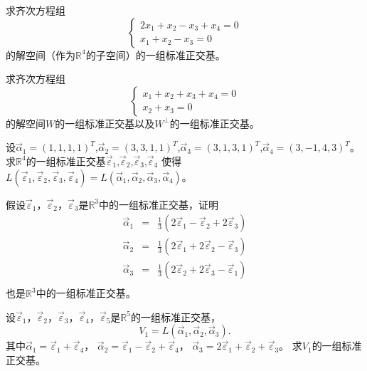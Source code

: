 \begin{ex}\label{6.13}
求齐次方程组
\begin{equation*}
  \begin{cases}
  2x_1+x_2-x_3+x_4=0\\
  x_1+x_2-x_3=0
  \end{cases}
\end{equation*}
的解空间（作为$\mathbb{R}^4$的子空间）的一组标准正交基。
\end{ex}

\begin{ex}\label{6.14}
求齐次方程组
\begin{equation*}
  \begin{cases}
  x_1+x_2+x_3+x_4=0\\
  x_2+x_3=0
  \end{cases}
\end{equation*}
的解空间$W$的一组标准正交基以及$W^{\bot}$的一组标准正交基。
\end{ex}

\begin{ex}\label{6.15}
设$\vec{\alpha}_1=(1,1,1,1)^T$,$\vec{\alpha}_2=(3,3,1,1)^T$,$\vec{\alpha}_3=(3,1,3,1)^T$,$\vec{\alpha}_4=(3,-1,4,3)^T$。
求$\mathbb{R}^4$的一组标准正交基$\vec{\varepsilon}_1$,$\vec{\varepsilon}_2$,$\vec{\varepsilon}_3$,$\vec{\varepsilon}_4$ 使得\\
$L(\vec{\varepsilon}_1,\vec{\varepsilon}_2,\vec{\varepsilon}_3,\vec{\varepsilon}_4)=L(\vec{\alpha}_1,\vec{\alpha}_2,\vec{\alpha}_3,\vec{\alpha}_4)$。
\end{ex}

\begin{ex}\label{6.16}
假设$\vec{\varepsilon}_1$，$\vec{\varepsilon}_2$，$\vec{\varepsilon}_3$是$\mathbb{R}^3$中的一组标准正交基，证明
\begin{eqnarray*}
 \vec{\alpha}_1 &=& \frac{1}{3}(2\vec{\varepsilon}_1-\vec{\varepsilon}_2+2\vec{\varepsilon}_3) \\
 \vec{\alpha}_2 &=& \frac{1}{3}(2\vec{\varepsilon}_1+2\vec{\varepsilon}_2-\vec{\varepsilon}_3) \\
 \vec{\alpha}_3 &=& \frac{1}{3}(2\vec{\varepsilon}_2+2\vec{\varepsilon}_3-\vec{\varepsilon}_1) \\
\end{eqnarray*}
也是$\mathbb{R}^3$中的一组标准正交基。
\end{ex}

\begin{ex}\label{6.17}
设$\vec{\varepsilon}_1$，$\vec{\varepsilon}_2$，$\vec{\varepsilon}_3$，$\vec{\varepsilon}_4$，$\vec{\varepsilon}_5$是$\mathbb{R}^5$的一组标准正交基，
\begin{equation*}
  V_1=L(\vec{\alpha}_1,\vec{\alpha}_2,\vec{\alpha}_3).
\end{equation*}
其中$\vec{\alpha}_1=\vec{\varepsilon}_1+\vec{\varepsilon}_4$，
$\vec{\alpha}_2=\vec{\varepsilon}_1-\vec{\varepsilon}_2+\vec{\varepsilon}_4$，
$\vec{\alpha}_3=2\vec{\varepsilon}_1+\vec{\varepsilon}_2+\vec{\varepsilon}_3$。
求$V_1$的一组标准正交基。
\end{ex}

